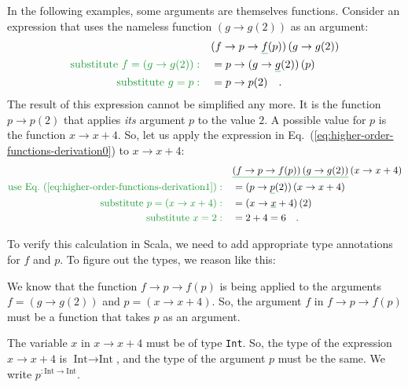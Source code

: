 In the following examples, some arguments are themselves functions.
Consider an expression that uses the nameless function $\left(g\rightarrow g(2)\right)$
as an argument:
\begin{align}
 & (f\rightarrow p\rightarrow\gunderline f(p))\left(g\rightarrow g(2)\right)\label{eq:higher-order-functions-derivation0}\\
{\color{greenunder}\text{substitute }f=\left(g\rightarrow g(2)\right):}\quad & =p\rightarrow(g\rightarrow\gunderline g(2))\,(p)\nonumber \\
{\color{greenunder}\text{substitute }g=p:}\quad & =p\rightarrow p(2)\quad.\label{eq:higher-order-functions-derivation1}
\end{align}
The result of this expression cannot be simplified any more. It is
the function $p\rightarrow p(2)$ that applies \emph{its} argument
$p$ to the value $2$. A possible value for $p$ is the function
$x\rightarrow x+4$. So, let us apply the expression in Eq.~(\ref{eq:higher-order-functions-derivation0})
to $x\rightarrow x+4$:
\begin{align*}
 & \gunderline{\left(f\rightarrow p\rightarrow f(p)\right)\left(g\rightarrow g(2)\right)}\left(x\rightarrow x+4\right)\\
{\color{greenunder}\text{use Eq.~(\ref{eq:higher-order-functions-derivation1})}:}\quad & =(p\rightarrow\gunderline p(2))\left(x\rightarrow x+4\right)\\
{\color{greenunder}\text{substitute }p=\left(x\rightarrow x+4\right):}\quad & =(x\rightarrow\gunderline x+4)\left(2\right)\\
{\color{greenunder}\text{substitute }x=2:}\quad & =2+4=6\quad.
\end{align*}

To verify this calculation in Scala, we need to add appropriate type
annotations for $f$ and $p$. To figure out the types, we reason
like this:

We know that the function $f\rightarrow p\rightarrow f(p)$ is being
applied to the arguments $f=\left(g\rightarrow g(2)\right)$ and $p=\left(x\rightarrow x+4\right)$.
So, the argument $f$ in $f\rightarrow p\rightarrow f(p)$ must be
a function that takes $p$ as an argument.

The variable $x$ in $x\rightarrow x+4$ must be of type \lstinline!Int!.
So, the type of the expression $x\rightarrow x+4$ is $\text{Int}\rightarrow\text{Int}$,
and the type of the argument $p$ must be the same. We write $p^{:\text{Int}\rightarrow\text{Int}}$.

